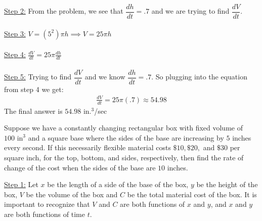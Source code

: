 \documentclass[11pt]{exam}
\begin{document}
\begin{questions}
\begin{solution}
\underline{Step 2:}  From the problem, we see that $\dfrac{dh}{dt}=.7$ and we are trying to find $\dfrac{dV}{dt}$. 
\\
\\
\underline{Step 3:} $V=(5^2)\pi h\implies V=25\pi h$
\\
\\
\underline{Step 4:} $\frac{dV}{dt}=25\pi \frac{dh}{dt}$
\\
\\
\underline{Step 5:} Trying to find $\dfrac{dV}{dt}$ and we know $\dfrac{dh}{dt}=.7$. So plugging into the equation from step 4 we get:
\begin{align*}
\frac{dV}{dt}=25\pi (.7)\approx 54.98
\end{align*}
The final answer is $54.98$ in.$^3$/sec
\end{solution}
\question Suppose we have a constantly changing rectangular box with fixed volume of $100\text{ in}^3$ and a square base where the sides of the base are increasing by $5$ inches every second. If this necessarily flexible material costs $\$10, \$20,$ and $\$30$ per square inch, for the top, bottom, and sides, respectively, then find the rate of change of the cost when the sides of the base are $10$ inches.
\begin{center}
\end{center}
\begin{solution}
 \underline{Step 1:} Let $x$ be the length of a side of the base of the box, $y$ be the height of the box, $V$ be the volume of the box and $C$ be the total material cost of the box. It is important to recognize that $V$ and $C$ are both functions of $x$ and $y$, and $x$ and $y$ are both functions of time $t$. 


\end{solution}
\end{questions}
\end{document}
